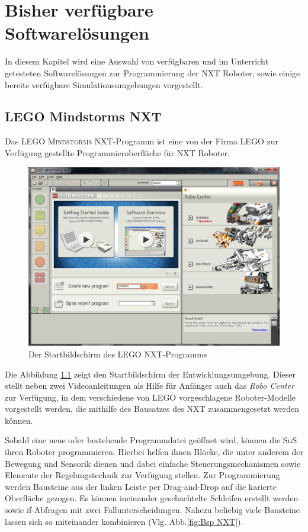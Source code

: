\documentclass[paper=a4, DIV=calc, BCOR=12mm, twoside=on, onecolumn=on, open = right, titlepage =on, parskip =half-, headsepline = on, footsepline = off, chapterprefix = off, appendixprefix = on, fontsize = 12pt, numbers = noenddot, abstract = on]{scrbook}
\begin{document}
\chapter{Bisher verfügbare Softwarelösungen}
\label{sec:software bisher}
In diesem Kapitel wird eine Auswahl von verfügbaren und im Unterricht getesteten Softwarelösungen zur Programmierung der NXT Roboter, sowie einige bereits verfügbare Simulationsumgebungen vorgestellt. 


\section{LEGO Mindstorms NXT}
\label{sec:LMNXT}

Das \textsc{LEGO Mindstorms} NXT-Programm ist eine von der Firma \textsc{LEGO} zur Verfügung gestellte Programmieroberfläche für NXT Roboter.

\begin{figure}[htb]
\centering
\includegraphics[width= \textwidth]{images/Startbildschirm_NXT.png} 
\caption[Der Startbildschirm des \textsc{LEGO} NXT-Programms]{Der Startbildschirm des \textsc{LEGO} NXT-\-Pro\-gramms}
\label{fig:NXT Start}
\end{figure}
Die Abbildung \ref{fig:NXT Start} zeigt den Startbildschirm der Entwicklungsumgebung. Dieser stellt neben zwei Videoanleitungen als Hilfe für Anfänger auch das \emph{Robo Center} zur Verfügung, in dem verschiedene von \textsc{LEGO} vorgeschlagene Roboter-Modelle vorgestellt werden, die mithilfe des Bausatzes des NXT zusammengesetzt werden können.

Sobald eine neue oder bestehende Programmdatei geöffnet wird, können die SuS ihren Roboter programmieren. Hierbei helfen ihnen Blöcke, die unter anderem der Bewegung und Sensorik dienen und dabei einfache Steuerungsmechanismen sowie Elemente der Regelungstechnik zur Verfügung stellen. Zur Programmierung werden Bausteine aus der linken Leiste per Drag-and-Drop auf die karierte Oberfläche gezogen. Es können ineinander geschachtelte Schleifen erstellt werden sowie if-Abfragen mit zwei Fallunterscheidungen. Nahezu beliebig viele Bausteine lassen sich so miteinander kombinieren (Vlg. Abb.\ref{fig:Bsp NXT}).
\end{document}

